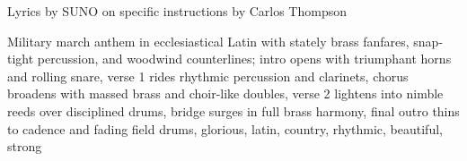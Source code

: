
\begin{notes}
Lyrics by SUNO on specific instructions by Carlos Thompson
\end{notes}
\begin{style}
Military march anthem in ecclesiastical Latin with stately brass fanfares, snap-tight percussion, and woodwind counterlines; intro opens with triumphant horns and rolling snare, verse 1 rides rhythmic percussion and clarinets, chorus broadens with massed brass and choir-like doubles, verse 2 lightens into nimble reeds over disciplined drums, bridge surges in full brass harmony, final outro thins to cadence and fading field drums, glorious, latin, country, rhythmic, beautiful, strong
\end{style}
